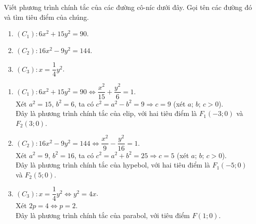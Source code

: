 \begin{bt}%
Viết phương trình chính tắc của các đường cô-níc dưới đây. Gọi tên các đường đó và tìm tiêu điểm của chúng.
\begin{enumerate}
\item $\left(C_1\right)\colon 6x^2 + 15y^2 = 90$.
\item $\left(C_2\right)\colon 16x^2 - 9y^2 = 144$.
\item $\left(C_3\right)\colon x = \dfrac{1}{4}y^2$.
\end{enumerate}
\loigiai
{
\begin{enumerate}
\item $\left(C_1\right)\colon 6x^2 + 15y^2 = 90 \Leftrightarrow \dfrac{x^2}{15} + \dfrac{y^2}{6} = 1$.\\
Xét $a^2=15$, $b^2=6$, ta có $c^2=a^2-b^2=9 \Rightarrow c=9$ (xét $a$; $b$; $c>0$). \\
Đây là phương trình chính tắc của elip, với hai tiêu điểm là $F_1\left(-3;0\right)$ và $F_2\left(3;0\right)$.
\item $\left(C_2\right)\colon 16x^2 - 9y^2 = 144 \Leftrightarrow \dfrac{x^2}{9} - \dfrac{y^2}{16} = 1$.\\
Xét $a^2=9$, $b^2=16$, ta có $c^2=a^2+b^2=25 \Rightarrow c=5$ (xét $a$; $b$; $c>0$). \\
Đây là phương trình chính tắc của hypebol, với hai tiêu điểm là $F_1\left(-5;0\right)$ và $F_2\left(5;0\right)$.
\item $\left(C_3\right)\colon x = \dfrac{1}{4}y^2 \Leftrightarrow y^2 = 4x$.\\
Xét $2p=4 \Leftrightarrow p=2$. \\
Đây là phương trình chính tắc của parabol, với tiêu điểm $F\left(1;0\right)$.
\end{enumerate}
}
\end{bt}

